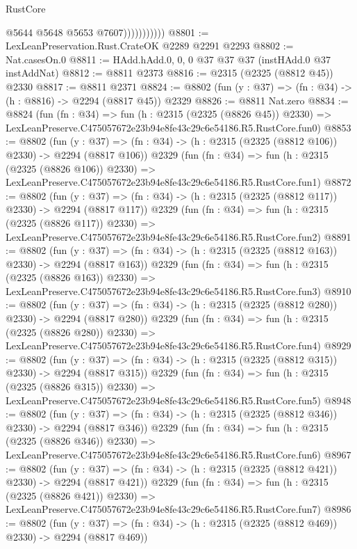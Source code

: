 \begin{lexlean}{RustCore}
\begin{coremodule}
                          @5644
                          @5648
                          @5653
                          @7607)))))))))))
@8801 := LexLeanPreservation.Rust.CrateOK @2289 @2291 @2293
@8802 := Nat.casesOn.{0}
@8811 := HAdd.hAdd.{0, 0, 0} @37 @37 @37 (instHAdd.{0} @37 instAddNat)
@8812 := @8811 @2373
@8816 := @2315 (@2325 (@8812 @45)) @2330
@8817 := @8811 @2371
@8824 := @8802 (fun (y : @37) => (fn : @34) -> (h : @8816) -> @2294 (@8817 @45)) @2329
@8826 := @8811 Nat.zero
@8834 := @8824
    (fun (fn : @34) =>
    fun (h : @2315 (@2325 (@8826 @45)) @2330) =>
    LexLeanPreserve.C475057672e23b94e8fe43c29c6e54186.R5.RustCore.fun0)
@8853 := @8802
    (fun (y : @37) => (fn : @34) -> (h : @2315 (@2325 (@8812 @106)) @2330) -> @2294 (@8817 @106))
    @2329
    (fun (fn : @34) =>
    fun (h : @2315 (@2325 (@8826 @106)) @2330) =>
    LexLeanPreserve.C475057672e23b94e8fe43c29c6e54186.R5.RustCore.fun1)
@8872 := @8802
    (fun (y : @37) => (fn : @34) -> (h : @2315 (@2325 (@8812 @117)) @2330) -> @2294 (@8817 @117))
    @2329
    (fun (fn : @34) =>
    fun (h : @2315 (@2325 (@8826 @117)) @2330) =>
    LexLeanPreserve.C475057672e23b94e8fe43c29c6e54186.R5.RustCore.fun2)
@8891 := @8802
    (fun (y : @37) => (fn : @34) -> (h : @2315 (@2325 (@8812 @163)) @2330) -> @2294 (@8817 @163))
    @2329
    (fun (fn : @34) =>
    fun (h : @2315 (@2325 (@8826 @163)) @2330) =>
    LexLeanPreserve.C475057672e23b94e8fe43c29c6e54186.R5.RustCore.fun3)
@8910 := @8802
    (fun (y : @37) => (fn : @34) -> (h : @2315 (@2325 (@8812 @280)) @2330) -> @2294 (@8817 @280))
    @2329
    (fun (fn : @34) =>
    fun (h : @2315 (@2325 (@8826 @280)) @2330) =>
    LexLeanPreserve.C475057672e23b94e8fe43c29c6e54186.R5.RustCore.fun4)
@8929 := @8802
    (fun (y : @37) => (fn : @34) -> (h : @2315 (@2325 (@8812 @315)) @2330) -> @2294 (@8817 @315))
    @2329
    (fun (fn : @34) =>
    fun (h : @2315 (@2325 (@8826 @315)) @2330) =>
    LexLeanPreserve.C475057672e23b94e8fe43c29c6e54186.R5.RustCore.fun5)
@8948 := @8802
    (fun (y : @37) => (fn : @34) -> (h : @2315 (@2325 (@8812 @346)) @2330) -> @2294 (@8817 @346))
    @2329
    (fun (fn : @34) =>
    fun (h : @2315 (@2325 (@8826 @346)) @2330) =>
    LexLeanPreserve.C475057672e23b94e8fe43c29c6e54186.R5.RustCore.fun6)
@8967 := @8802
    (fun (y : @37) => (fn : @34) -> (h : @2315 (@2325 (@8812 @421)) @2330) -> @2294 (@8817 @421))
    @2329
    (fun (fn : @34) =>
    fun (h : @2315 (@2325 (@8826 @421)) @2330) =>
    LexLeanPreserve.C475057672e23b94e8fe43c29c6e54186.R5.RustCore.fun7)
@8986 := @8802
    (fun (y : @37) => (fn : @34) -> (h : @2315 (@2325 (@8812 @469)) @2330) -> @2294 (@8817 @469))

\end{coremodule}
\end{lexlean}
